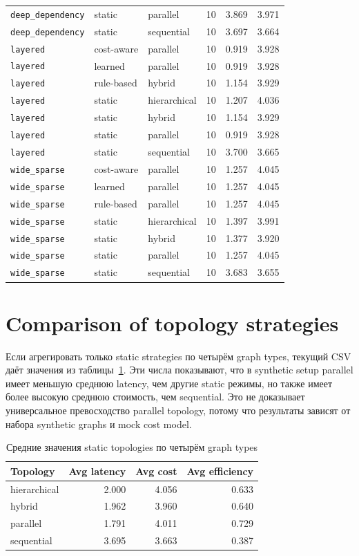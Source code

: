 \documentclass[12pt,a4paper]{report}
\newcommand{\code}[1]{\texttt{#1}}
\begin{document}
\begin{longtable}{p{}p{}p{}r r r}
\code{deep\_dependency} & static & parallel & 10 & 3.869 & 3.971 \\
\code{deep\_dependency} & static & sequential & 10 & 3.697 & 3.664 \\
\code{layered} & cost-aware & parallel & 10 & 0.919 & 3.928 \\
\code{layered} & learned & parallel & 10 & 0.919 & 3.928 \\
\code{layered} & rule-based & hybrid & 10 & 1.154 & 3.929 \\
\code{layered} & static & hierarchical & 10 & 1.207 & 4.036 \\
\code{layered} & static & hybrid & 10 & 1.154 & 3.929 \\
\code{layered} & static & parallel & 10 & 0.919 & 3.928 \\
\code{layered} & static & sequential & 10 & 3.700 & 3.665 \\
\code{wide\_sparse} & cost-aware & parallel & 10 & 1.257 & 4.045 \\
\code{wide\_sparse} & learned & parallel & 10 & 1.257 & 4.045 \\
\code{wide\_sparse} & rule-based & parallel & 10 & 1.257 & 4.045 \\
\code{wide\_sparse} & static & hierarchical & 10 & 1.397 & 3.991 \\
\code{wide\_sparse} & static & hybrid & 10 & 1.377 & 3.920 \\
\code{wide\_sparse} & static & parallel & 10 & 1.257 & 4.045 \\
\code{wide\_sparse} & static & sequential & 10 & 3.683 & 3.655 \\
\bottomrule
\end{longtable}

\section{Comparison of topology strategies}

Если агрегировать только static strategies по четырём graph types, текущий CSV даёт значения из таблицы~\ref{tab:staticavg}. Эти числа показывают, что в synthetic setup parallel имеет меньшую среднюю latency, чем другие static режимы, но также имеет более высокую среднюю стоимость, чем sequential. Это не доказывает универсальное превосходство parallel topology, потому что результаты зависят от набора synthetic graphs и mock cost model.

\begin{table}[h]
\centering
\caption{Средние значения static topologies по четырём graph types}
\label{tab:staticavg}
\begin{tabular}{lrrr}
\toprule
Topology & Avg latency & Avg cost & Avg efficiency \\
\midrule
hierarchical & 2.000 & 4.056 & 0.633 \\
hybrid & 1.962 & 3.960 & 0.640 \\
parallel & 1.791 & 4.011 & 0.729 \\
sequential & 3.695 & 3.663 & 0.387 \\
\bottomrule
\end{tabular}
\end{table}
\end{document}
